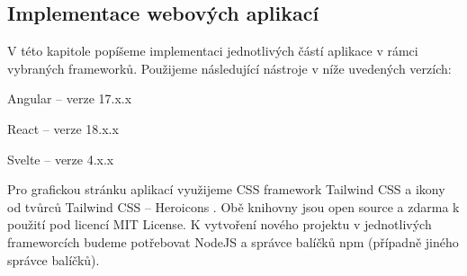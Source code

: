 \subsection{Implementace webových aplikací}

V této kapitole popíšeme implementaci jednotlivých částí aplikace v rámci vybraných frameworků. Použijeme následující nástroje v níže uvedených verzích:

\begin{citemize}
	\item Angular -- verze 17.x.x
	\item React -- verze 18.x.x
	\item Svelte -- verze 4.x.x
\end{citemize}

Pro grafickou stránku aplikací využijeme CSS framework Tailwind CSS \cite{tailwindcssframework} a ikony od tvůrců Tailwind CSS -- Heroicons \cite{heroiconslib}. 
Obě knihovny jsou open source a zdarma k použití pod licencí MIT License. 
K vytvoření nového projektu v jednotlivých frameworcích budeme potřebovat NodeJS a správce balíčků npm (případně jiného správce balíčků).

